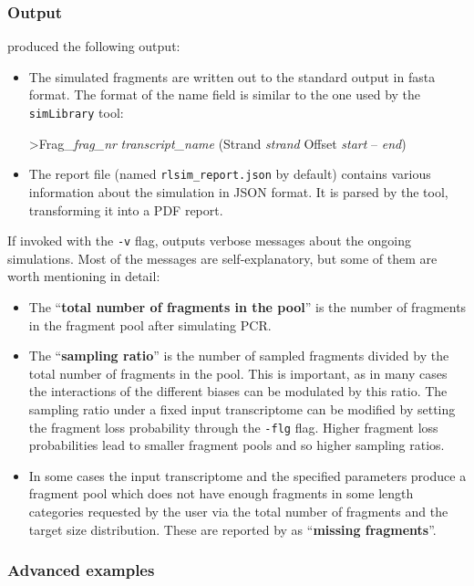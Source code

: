\subsubsection{Output}

\rlsim produced the following output:

\begin{itemize}
    \item{The simulated fragments are written out to the standard output in fasta format. The format of the name field is similar to the one used by the \texttt{simLibrary} tool: 
    \begin{center}
    {>Frag\_\textit{frag\_nr} \textit{transcript\_name} (Strand \textit{strand} Offset \textit{start} -- \textit{end})}
    \end{center}
    }
    \item{The \rlsim report file (named \texttt{rlsim\_report.json} by default) contains various information about the simulation in JSON format. 
    It is parsed by the \plotRlsim tool, transforming it into a PDF report.} 
\end{itemize}

If invoked with the \texttt{-v} flag, \rlsim outputs verbose messages about the ongoing simulations. 
Most of the messages are self-explanatory, but some of them are worth mentioning in detail:
\begin{itemize}
    \item{The ``\textbf{total number of fragments in the pool}'' is the number of fragments in the fragment pool after simulating PCR.}
    \item{The ``\textbf{sampling ratio}'' is the number of sampled fragments divided by the total number of fragments in the pool. This is important, as in many cases the interactions of the different biases can be modulated by this ratio. The sampling ratio under a fixed input transcriptome can be modified by setting the fragment loss probability through the \texttt{-flg} flag. Higher fragment loss probabilities lead to smaller fragment pools and so higher sampling ratios.}
    \item{In some cases the input transcriptome and the specified parameters produce a fragment pool which does not have enough fragments in some length categories requested by the user via the total number of fragments and the target size distribution. These are reported by \rlsim as ``\textbf{missing fragments}''.}
\end{itemize}

\subsubsection{Advanced examples}

